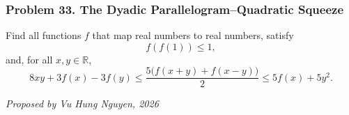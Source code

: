 \subsubsection*{Problem 33. The Dyadic Parallelogram--Quadratic Squeeze}

\begin{exercisebox}[hard]

Find all functions $f$ that map real numbers to real numbers, satisfy
\[
f(f(1))\leq1,
\]
and, for all $x,y\in\mathbb R$,
\[
8xy+3f(x)-3f(y)
\leq\frac{5\bigl(f(x+y)+f(x-y)\bigr)}2
\leq5f(x)+5y^2.
\]

\begin{flushright}
\textit{Proposed by Vu Hung Nguyen, 2026}
\end{flushright}


\end{exercisebox}